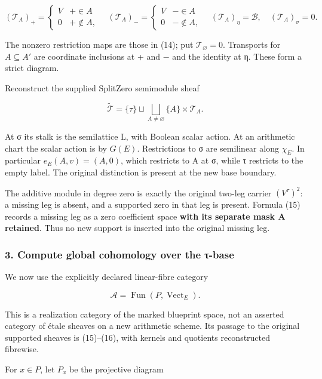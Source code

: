 \documentclass{article}
\begin{document}
\[
(\mathcal T_A)_+=\begin{cases}V&+\in A\\0&+\notin A,\end{cases}
\quad
(\mathcal T_A)_-=\begin{cases}V&-\in A\\0&-\notin A,\end{cases}
\quad
(\mathcal T_A)_\eta=\mathscr B,\quad
(\mathcal T_A)_\sigma=0.
\tag{15}
\]

The nonzero restriction maps are those in (14); put \(\mathcal T_\varnothing=0\). Transports for \(A\subseteq A'\) are coordinate inclusions at + and − and the identity at η. These form a strict diagram.

Reconstruct the supplied SplitZero semimodule sheaf

\[
\widetilde{\mathcal T}
=\{\tau\}\sqcup\bigsqcup_{A\ne\varnothing}\{A\}\times\mathcal T_A.
\tag{16}
\]

At σ its stalk is the semilattice L, with Boolean scalar action. At an arithmetic chart the scalar action is by \(G(E)\). Restrictions to σ are semilinear along \(\chi_E\). In particular \(e_E(A,v)=(A,0)\), which restricts to A at σ, while τ restricts to the empty label. The original distinction is present at the new base boundary.

The additive module in degree zero is exactly the original two-leg carrier \((V^\tau)^2\): a missing leg is absent, and a supported zero in that leg is present. Formula (15) records a missing leg as a zero coefficient space \textbf{with its separate mask A retained}. Thus no new support is inserted into the original missing leg.

\subsubsection{3. Compute global cohomology over the τ-base}\label{endpoint-tau_base--compute-global-cohomology-over-the-ux3c4-base}

We now use the explicitly declared linear-fibre category

\[
\mathcal A=\operatorname{Fun}(P,\operatorname{Vect}_E).
\]

This is a realization category of the marked blueprint space, not an asserted category of étale sheaves on a new arithmetic scheme. Its passage to the original supported sheaves is (15)--(16), with kernels and quotients reconstructed fibrewise.

For \(x\in P\), let \(P_x\) be the projective diagram
\end{document}
